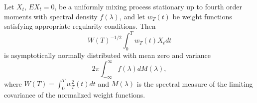 Let $X_t$, $EX_t = 0$, be a uniformly mixing process stationary up to fourth order moments with spectral density $f(\lambda)$, and let $w_T(t)$ be weight functions satisfying appropriate regularity conditions. Then
$$W(T)^{-1/2} \int_0^T w_T(t) X_t dt$$
is asymptotically normally distributed with mean zero and variance
$$2\pi \int_{-\infty}^{\infty} f(\lambda) dM(\lambda),$$
where $W(T) = \int_0^T w_T^2(t) dt$ and $M(\lambda)$ is the spectral measure of the limiting covariance of the normalized weight functions.
